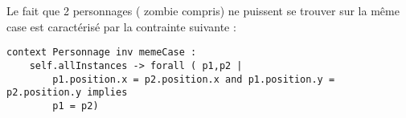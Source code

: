 Le fait que 2 personnages ( zombie compris) ne puissent se trouver sur la même case est caractérisé par la contrainte suivante :

\begin{lstlisting}
context Personnage inv memeCase :
	self.allInstances -> forall ( p1,p2 |
		p1.position.x = p2.position.x and p1.position.y = p2.position.y implies
		p1 = p2)
\end{lstlisting}